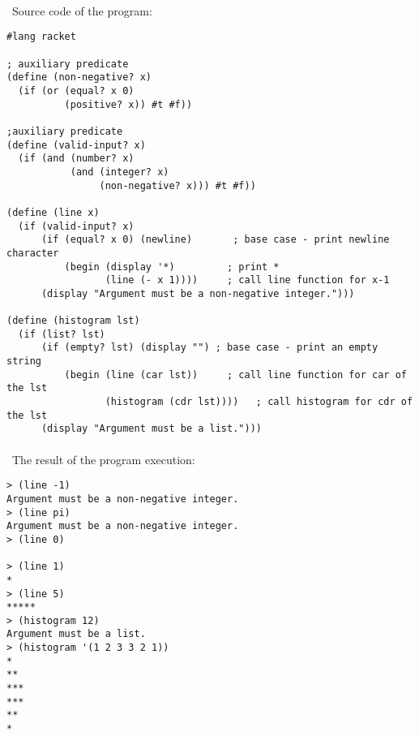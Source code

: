 \documentclass{article}
\begin{document}
\paragraph{}\
\paragraph{}\
Source code of the program:

\begin{verbatim} 
#lang racket

; auxiliary predicate
(define (non-negative? x)
  (if (or (equal? x 0)
          (positive? x)) #t #f))

;auxiliary predicate
(define (valid-input? x)
  (if (and (number? x)
           (and (integer? x)
                (non-negative? x))) #t #f))

(define (line x)
  (if (valid-input? x)
      (if (equal? x 0) (newline)	   ; base case - print newline character
          (begin (display '*)	      ; print *
                 (line (- x 1))))	  ; call line function for x-1
      (display "Argument must be a non-negative integer.")))

(define (histogram lst)
  (if (list? lst)
      (if (empty? lst) (display "")	; base case - print an empty string
          (begin (line (car lst))	  ; call line function for car of the lst
                 (histogram (cdr lst))))   ; call histogram for cdr of the lst
      (display "Argument must be a list.")))
\end{verbatim}

\paragraph{}\
	The result of the program execution:
	
\begin{verbatim} 
> (line -1)
Argument must be a non-negative integer.
> (line pi)
Argument must be a non-negative integer.
> (line 0)

> (line 1)
*
> (line 5)
*****
> (histogram 12)
Argument must be a list.
> (histogram '(1 2 3 3 2 1))
*
**
***
***
**
*
\end{verbatim}
\end{document}
